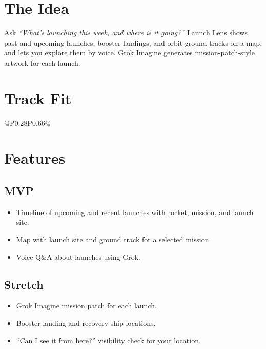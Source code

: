 \documentclass[11pt]{article}
\begin{document}

\section{The Idea}
Ask \emph{``What's launching this week, and where is it going?''} Launch Lens shows
past and upcoming launches, booster landings, and orbit ground tracks on a map,
and lets you explore them by voice. Grok Imagine generates mission-patch-style
artwork for each launch.

\section{Track Fit}
\begin{tabular}{@{}P{0.28\textwidth}P{0.66\textwidth}@{}}
\toprule
{}
\bottomrule
\end{tabular}

\section{Features}
\subsection{MVP}
\begin{itemize}
  \item Timeline of upcoming and recent launches with rocket, mission, and launch site.
  \item Map with launch site and ground track for a selected mission.
  \item Voice Q\&A about launches using Grok.
\end{itemize}
\subsection{Stretch}
\begin{itemize}
  \item Grok Imagine mission patch for each launch.
  \item Booster landing and recovery-ship locations.
  \item ``Can I see it from here?'' visibility check for your location.
\end{itemize}
\end{document}
